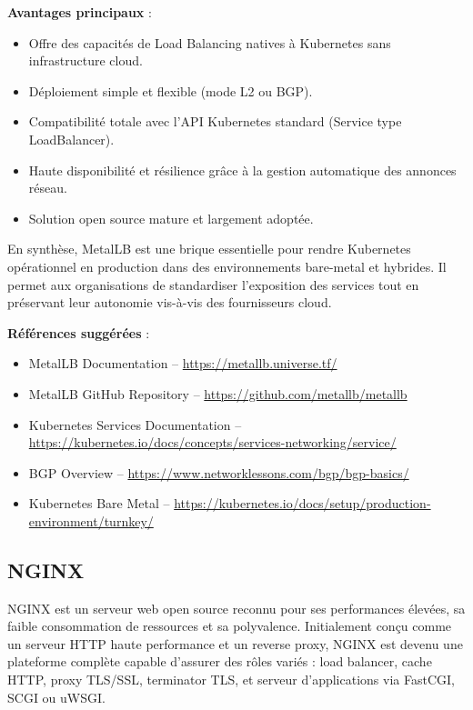 \textbf{Avantages principaux} :
\begin{itemize}
	\item Offre des capacités de Load Balancing natives à Kubernetes sans infrastructure cloud.
	\item Déploiement simple et flexible (mode L2 ou BGP).
	\item Compatibilité totale avec l’API Kubernetes standard (Service type LoadBalancer).
	\item Haute disponibilité et résilience grâce à la gestion automatique des annonces réseau.
	\item Solution open source mature et largement adoptée.
\end{itemize}

En synthèse, MetalLB est une brique essentielle pour rendre Kubernetes opérationnel en production dans des environnements bare-metal et hybrides. Il permet aux organisations de standardiser l’exposition des services tout en préservant leur autonomie vis-à-vis des fournisseurs cloud.

\textbf{Références suggérées} :
\begin{itemize}
	\item MetalLB Documentation – \url{https://metallb.universe.tf/}
	\item MetalLB GitHub Repository – \url{https://github.com/metallb/metallb}
	\item Kubernetes Services Documentation – \url{https://kubernetes.io/docs/concepts/services-networking/service/}
	\item BGP Overview – \url{https://www.networklessons.com/bgp/bgp-basics/}
	\item Kubernetes Bare Metal – \url{https://kubernetes.io/docs/setup/production-environment/turnkey/}
\end{itemize}



\subsection{NGINX}

NGINX est un serveur web open source reconnu pour ses performances élevées, sa faible consommation de ressources et sa polyvalence. Initialement conçu comme un serveur HTTP haute performance et un reverse proxy, NGINX est devenu une plateforme complète capable d’assurer des rôles variés  : load balancer, cache HTTP, proxy TLS/SSL, terminator TLS, et serveur d’applications via FastCGI, SCGI ou uWSGI.

